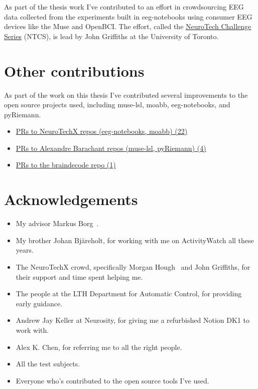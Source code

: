 \documentclass[a4paper]{article}
\begin{document}
\begin{refsection}
        As part of the thesis work I've contributed to an effort in crowdsourcing EEG data collected from the experiments built in eeg-notebooks using consumer EEG devices like the Muse and OpenBCI\@. The effort, called the \href{https://neurotech-challenge.com/}{NeuroTech Challenge Series} (NTCS), is lead by John Griffiths at the University of Toronto.


\section{Other contributions}

    As part of the work on this thesis I've contributed several improvements to the open source projects used, including muse-lsl, moabb, eeg-notebooks, and pyRiemann.

    \begin{itemize}
        \item \href{%
                https://github.com/search?q=org%
            }{PRs to NeuroTechX repos (eeg-notebooks, moabb) (22)}
        \item \href{%
                https://github.com/search?q=org%
            }{PRs to Alexandre Barachant repos (muse-lsl, pyRiemann) (4)}
        \item \href{%
                https://github.com/search?q=org%
            }{PRs to the braindecode repo (1)}
    \end{itemize}

\section*{Acknowledgements}

\begin{itemize}
 \item My advisor Markus Borg~.
 \item My brother Johan Bjäreholt, for working with me on ActivityWatch all these years.
 \item The NeuroTechX crowd, specifically Morgan Hough~ and John Griffiths, for their support and time spent helping me.
 \item The people at the LTH Department for Automatic Control, for providing early guidance.
 \item Andrew Jay Keller at Neurosity, for giving me a refurbished Notion DK1 to work with.
 \item Alex K. Chen, for referring me to all the right people.
 \item All the test subjects.
 \item Everyone who's contributed to the open source tools I've used.
\end{itemize}


\end{refsection}
\end{document}
